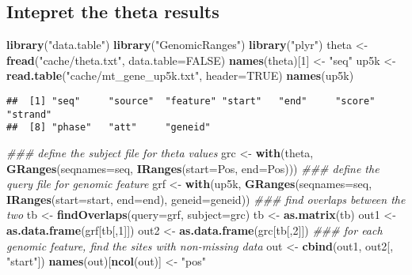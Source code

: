 \documentclass[]{article}
\newenvironment{Shaded}{\begin{snugshade}}{\end{snugshade}}
\newcommand{\CommentTok}[1]{\textcolor[rgb]{0.56,0.35,0.01}{\textit{#1}}}
\newcommand{\DataTypeTok}[1]{\textcolor[rgb]{0.13,0.29,0.53}{#1}}
\newcommand{\DecValTok}[1]{\textcolor[rgb]{0.00,0.00,0.81}{#1}}
\newcommand{\KeywordTok}[1]{\textcolor[rgb]{0.13,0.29,0.53}{\textbf{#1}}}
\newcommand{\NormalTok}[1]{#1}
\newcommand{\OtherTok}[1]{\textcolor[rgb]{0.56,0.35,0.01}{#1}}
\newcommand{\StringTok}[1]{\textcolor[rgb]{0.31,0.60,0.02}{#1}}
\begin{document}
\hypertarget{intepret-the-theta-results}{%
\subsection{Intepret the theta
results}\label{intepret-the-theta-results}}

\begin{Shaded}
\begin{Highlighting}[]
\KeywordTok{library}\NormalTok{(}\StringTok{"data.table"}\NormalTok{)}
\KeywordTok{library}\NormalTok{(}\StringTok{"GenomicRanges"}\NormalTok{)}
\KeywordTok{library}\NormalTok{(}\StringTok{"plyr"}\NormalTok{)}
\NormalTok{theta <-}\StringTok{ }\KeywordTok{fread}\NormalTok{(}\StringTok{"cache/theta.txt"}\NormalTok{, }\DataTypeTok{data.table=}\OtherTok{FALSE}\NormalTok{)}
\KeywordTok{names}\NormalTok{(theta)[}\DecValTok{1}\NormalTok{] <-}\StringTok{ "seq"}
\NormalTok{up5k <-}\StringTok{ }\KeywordTok{read.table}\NormalTok{(}\StringTok{"cache/mt_gene_up5k.txt"}\NormalTok{, }\DataTypeTok{header=}\OtherTok{TRUE}\NormalTok{)}
\KeywordTok{names}\NormalTok{(up5k)}
\end{Highlighting}
\end{Shaded}

\begin{verbatim}
##  [1] "seq"     "source"  "feature" "start"   "end"     "score"   "strand" 
##  [8] "phase"   "att"     "geneid"
\end{verbatim}

\begin{Shaded}
\begin{Highlighting}[]
\CommentTok{### define the subject file for theta values}
\NormalTok{grc <-}\StringTok{ }\KeywordTok{with}\NormalTok{(theta, }\KeywordTok{GRanges}\NormalTok{(}\DataTypeTok{seqnames=}\NormalTok{seq, }\KeywordTok{IRanges}\NormalTok{(}\DataTypeTok{start=}\NormalTok{Pos, }\DataTypeTok{end=}\NormalTok{Pos)))}
\CommentTok{### define the query file for genomic feature}
\NormalTok{grf <-}\StringTok{ }\KeywordTok{with}\NormalTok{(up5k, }\KeywordTok{GRanges}\NormalTok{(}\DataTypeTok{seqnames=}\NormalTok{seq, }\KeywordTok{IRanges}\NormalTok{(}\DataTypeTok{start=}\NormalTok{start, }\DataTypeTok{end=}\NormalTok{end), }\DataTypeTok{geneid=}\NormalTok{geneid))}
\CommentTok{### find overlaps between the two}
\NormalTok{tb <-}\StringTok{ }\KeywordTok{findOverlaps}\NormalTok{(}\DataTypeTok{query=}\NormalTok{grf, }\DataTypeTok{subject=}\NormalTok{grc)}
\NormalTok{tb <-}\StringTok{ }\KeywordTok{as.matrix}\NormalTok{(tb)}
\NormalTok{out1 <-}\StringTok{ }\KeywordTok{as.data.frame}\NormalTok{(grf[tb[,}\DecValTok{1}\NormalTok{]])}
\NormalTok{out2 <-}\StringTok{ }\KeywordTok{as.data.frame}\NormalTok{(grc[tb[,}\DecValTok{2}\NormalTok{]])}
\CommentTok{### for each genomic feature, find the sites with non-missing data}
\NormalTok{out <-}\StringTok{ }\KeywordTok{cbind}\NormalTok{(out1, out2[, }\StringTok{"start"}\NormalTok{]) }
\KeywordTok{names}\NormalTok{(out)[}\KeywordTok{ncol}\NormalTok{(out)] <-}\StringTok{ "pos"}
\end{Highlighting}
\end{Shaded}
\end{document}
